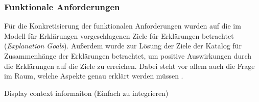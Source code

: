 \subsubsection{Funktionale Anforderungen}

Für die Konkretisierung der funktionalen Anforderungen wurden auf die im Modell für Erklärungen vorgeschlagenen Ziele für Erklärungen betrachtet (\textit{Explanation Goals}). Außerdem wurde zur Lösung der Ziele der Katalog für Zusammenhänge der Erklärungen betrachtet, um positive Auswirkungen durch die Erklärungen auf die Ziele zu erreichen. Dabei steht vor allem auch die Frage im Raum, welche Aspekte genau erklärt werden müssen \cite{kohl_explainability_2019}.



Display context informaiton (Einfach zu integrieren) \cite{wiegand_id_2020}